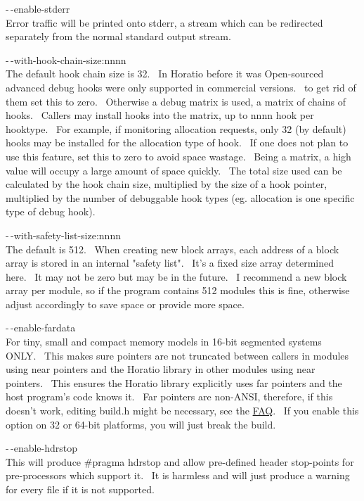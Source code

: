 \documentclass{article}
\begin{document}
\par -$\,$-enable-stderr
\\
Error traffic will be printed onto stderr, a stream which can be
redirected separately from the normal standard output stream.\\

\par -$\,$-with-hook-chain-size:nnnn
\\
The default hook chain size is 32.~ In Horatio before it was
Open-sourced advanced debug hooks were only supported in commercial
versions.~
to get rid of them set this to zero.~ Otherwise a debug matrix is
used, a matrix of chains of hooks.~ Callers may install hooks into
the matrix, up to nnnn hook per hooktype.~ For example, if
monitoring
allocation requests, only 32 (by default) hooks may be installed for
the
allocation type of hook.~ If one does not plan to use this
feature,
set this to zero to avoid space wastage.~ Being a matrix, a high
value will occupy a large amount of space quickly.~ The total size
used can be calculated by the hook chain size, multiplied by the size of
a hook pointer, multiplied by the number of debuggable hook types (eg.
allocation is one specific type of debug hook).\\

\par -$\,$-with-safety-list-size:nnnn
\\
The default is 512.~ When creating new block arrays, each address
of a block array is stored in an internal "safety list".~ It's a
fixed
size array determined here.~ It may not be zero but may be in the
future.~ I recommend a new block array per module, so if the
program
contains 512 modules this is fine, otherwise adjust accordingly to save
space or provide more space.

\par -$\,$-enable-fardata
\\
For tiny, small and compact memory models in 16-bit segmented systems
ONLY.~ This makes sure pointers are not truncated between callers
in modules using near pointers and the Horatio library in other
modules
using near pointers.~ This ensures the Horatio library explicitly
uses far pointers and the host program's code knows it.~ Far
pointers are non-ANSI, therefore, if this doesn't work,
editing build.h might be necessary, see the \href{#FAQ}{FAQ}.~
If you enable this option on 32 or 64-bit platforms, you will just
break the build.\\

\par -$\,$-enable-hdrstop\\
This will produce \#pragma hdrstop and allow pre-defined header
stop-points for pre-processors which support it.~ It is harmless
and will just produce a warning for every file if it is not supported.\\
\end{document}
